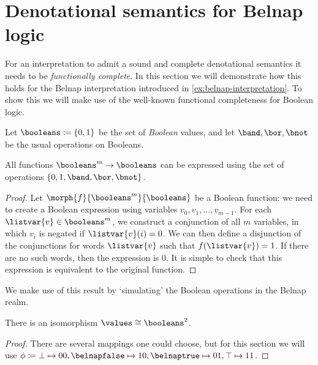 \section{Denotational semantics for Belnap logic}\label{sec:denotational-belnap}

For an interpretation to admit a sound and complete denotational semantics it
needs to be \emph{functionally complete}.
In this section we will demonstrate how this holds for the Belnap interpretation
introduced in \cref{ex:belnap-interpretation}.
To show this we will make use of the well-known functional completeness for
Boolean logic.

\begin{definition}
    Let \(\booleans \coloneqq \{0, 1\}\) be the set of \emph{Boolean} values,
    and let \(\band,\bor,\bnot\) be the usual operations on Booleans.
\end{definition}

\begin{lemma}\label{lem:boolean-complete}
    All functions \(\booleans^{m} \to \booleans\) can be expressed using
    the set of operations \(\{0, 1, \band,\bor,\bnot\}\).
\end{lemma}
\begin{proof}
    Let \(\morph{f}{\booleans^{m}}{\booleans}\) be a Boolean function: we need
    to create a Boolean expression using variables \(v_0, v_1, \dots, v_{m-1}\).
    For each \(\listvar{v} \in \booleans^m\), we construct a conjunction of
    all \(m\) variables, in which \(v_i\) is negated if \(\listvar{v}(i) = 0\).
    We can then define a disjunction of the conjunctions for words
    \(\listvar{v}\) such that \(f(\listvar{v}) = 1\).
    If there are no such words, then the expression is \(0\).
    It is simple to check that this expression is equivalent to the original
    function.
\end{proof}

We make use of this result by `simulating' the Boolean operations in the
Belnap realm.

\begin{lemma}
    There is an isomorphism \(\values \cong \booleans^2\).
\end{lemma}
\begin{proof}
    There are several mappings one could choose, but for this
    section we will use \(\phi \coloneqq
    \bot \mapsto 00, \belnapfalse \mapsto 10,
    \belnaptrue \mapsto 01, \top \mapsto 11
    \).
\end{proof}

